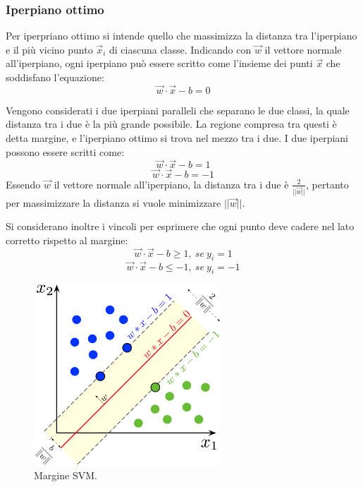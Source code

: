 \documentclass[oneside]{book}
\begin{document}


\subsubsection{Iperpiano ottimo}
Per iperpriano ottimo si intende quello che massimizza la distanza tra l'iperpiano e il più vicino punto $\vec{x}_i$ di ciascuna classe. Indicando con $\vec{w}$ il vettore normale all'iperpiano, ogni iperpiano può essere scritto come l'insieme dei punti $\vec{x}$ che soddisfano l'equazione:
$$\vec{w}\cdot\vec{x} - b = 0$$

Vengono considerati i due iperpiani paralleli che separano le due classi, la quale distanza tra i due è la più grande possibile. La regione compresa tra questi è detta margine, e l'iperpiano ottimo si trova nel mezzo tra i due. I due iperpiani possono essere scritti come:
$$\vec{w}\cdot\vec{x} - b = 1$$
$$\vec{w}\cdot\vec{x} - b = - 1$$
Essendo $\vec{w}$ il vettore normale all'iperpiano, la distanza tra i due è $\frac{2}{||\vec{w}||}$, pertanto per massimizzare la distanza si vuole minimizzare $ ||\vec{w}||$.

Si considerano inoltre i vincoli per esprimere che ogni punto deve cadere nel lato corretto rispetto al margine:
$$\vec{w}\cdot\vec{x} - b \geq 1,\ se\ y_i = 1$$
$$\vec{w}\cdot\vec{x} - b \leq - 1,\ se\ y_i = -1$$


\begin{figure}[h!]
	\centering
	\includegraphics[width=7cm]{assets/svm-margin.png}
	\caption[Caption for LOF]{Margine SVM.\footnotemark}
	\label{fig:svm-margin}
\end{figure}

\end{document}

